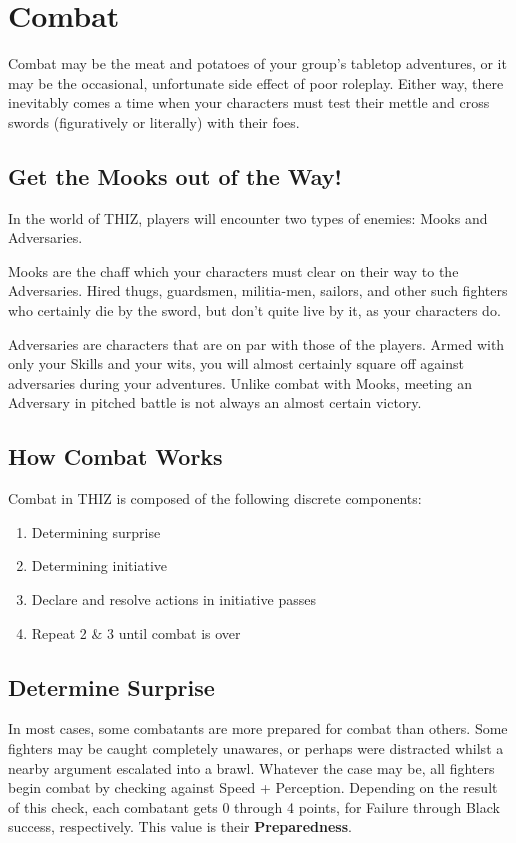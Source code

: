\documentclass[oneside]{book}
\begin{document}
\chapter{Combat}
\begin{multicols}{2}
Combat may be the meat and potatoes of your group's tabletop adventures, or it may be the occasional, unfortunate side effect of poor roleplay. Either way, there inevitably comes a time when your characters must test their mettle and cross swords (figuratively or literally) with their foes. 

\section{Get the Mooks out of the Way!}
In the world of THIZ, players will encounter two types of enemies: Mooks and Adversaries. 

Mooks are the chaff which your characters must clear on their way to the Adversaries. Hired thugs, guardsmen, militia-men, sailors, and other such fighters who certainly die by the sword, but don't quite live by it, as your characters do. 

Adversaries are characters that are on par with those of the players. Armed with only your Skills and your wits, you will almost certainly square off against adversaries during your adventures. Unlike combat with Mooks, meeting an Adversary in pitched battle is not always an almost certain victory. 

\section{How Combat Works}
Combat in THIZ is composed of the following discrete components:
\begin{enumerate}
  \setlength{\itemsep}{0cm}%
  \setlength{\parskip}{0cm}%
  \item Determining surprise
  \item Determining initiative
  \item Declare and resolve actions in initiative passes
  \item Repeat 2 \& 3 until combat is over
\end{enumerate}

\section{Determine Surprise}
In most cases, some combatants are more prepared for combat than others. Some fighters may be caught completely unawares, or perhaps were distracted whilst a nearby argument escalated into a brawl. Whatever the case may be, all fighters begin combat by checking against Speed + Perception. Depending on the result of this check, each combatant gets 0 through 4 points, for Failure through Black success, respectively. This value is their \textbf{Preparedness}.  


\end{multicols}
\end{document}
